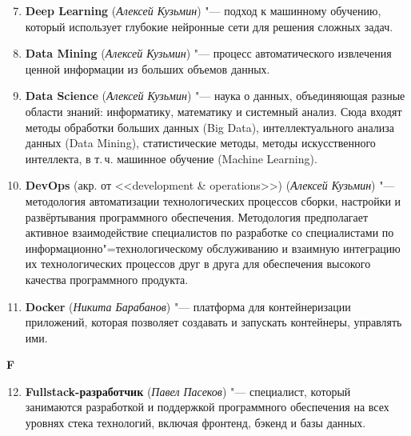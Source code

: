 \begin{enumerate}
    \setcounter{enumi}{6}

    \item \textbf{Deep Learning} (\textit{Алексей Кузьмин}) "--- 
    подход к машинному обучению, который использует глубокие нейронные сети для решения сложных задач.

    \item \textbf{Data Mining} (\textit{Алексей Кузьмин}) "--- 
    процесс автоматического извлечения ценной информации из больших объемов данных. 

    \item \textbf{Data Science} (\textit{Алексей Кузьмин}) "--- 
    наука о данных, объединяющая разные области знаний: информатику, математику и системный анализ. Сюда входят методы обработки больших данных (Big Data), интеллектуального анализа данных (Data Mining), статистические методы, методы искусственного интеллекта, в т.\,ч. машинное обучение (Machine Learning).

    \item \textbf{DevOps} (акр. от <<development \& operations>>) (\textit{Алексей Кузьмин}) "--- 
    методология автоматизации технологических процессов сборки, настройки и развёртывания программного обеспечения. Методология предполагает активное взаимодействие специалистов по разработке со специалистами по информационно"=технологическому обслуживанию и взаимную интеграцию их технологических процессов друг в друга для обеспечения высокого качества программного продукта.

    \item \textbf{Docker} (\textit{Никита Барабанов}) "--- 
    платформа для контейнеризации приложений, которая позволяет создавать и запускать контейнеры, управлять ими. 
\end{enumerate}

\begin{flushleft} \large\textbf{F} \end{flushleft}

\begin{enumerate}
    \setcounter{enumi}{11}

    \item \textbf{Fullstack-разработчик} (\textit{Павел Пасеков}) "--- 
    специалист, который занимаются разработкой и поддержкой программного обеспечения на всех уровнях стека технологий, включая фронтенд, бэкенд и базы данных.

\end{enumerate}


